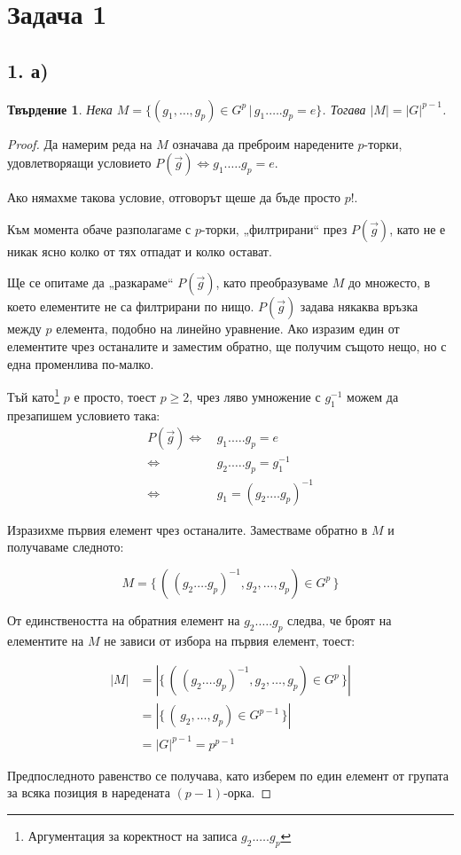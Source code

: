 \documentclass{article}
\newtheorem*{prop}{Твърдение}
\begin{document}
\section*{Задача 1}

\subsection*{1. а)}
\begin{prop}
    Нека $M = \{(g_1, \dots, g_p) \in G^p \, | \, g_1.\dots.g_p = e\}$.
    Тогава $|M| = |G|^{p-1}$.
\end{prop}
\begin{proof}
    Да намерим реда на $M$ означава да преброим наредените $p$-торки, удовлетворяащи условието
    $P(\vec g) \Leftrightarrow {g_1.\dots. g_p = e}$.

    Ако нямахме такова условие, отговорът щеше да бъде просто $p!$.

    Към момента обаче разполагаме с $p$-торки, „филтрирани“ през $P(\vec g)$, като не е никак ясно колко от тях отпадат и колко остават.

    Ще се опитаме да „разкараме“ $P(\vec g)$, като преобразуваме $M$ до множесто, в което елементите не са филтрирани по нищо.
    $P(\vec g)$ задава някаква връзка между $p$ елемента, подобно на линейно уравнение. Ако изразим един от елементите чрез останалите и заместим обратно, ще получим същото нещо, но с една променлива по-малко.

    Тъй като\footnote{Аргументация за коректност на записа $g_2 . \dots . g_p$} $p$ е просто, тоест $p \ge 2$, чрез ляво умножение с $g_1^{-1}$ можем да презапишем условието така:
    \begin{align*}
        P(\vec g) \Leftrightarrow \, &g_1.\dots.g_p = e \\
        \Leftrightarrow \, &g_2. \dots . g_p = g_1^{-1} \\
        \Leftrightarrow \, &g_1 = (g_2 . \dots g_p)^{-1}
    \end{align*}

    Изразихме първия елемент чрез останалите. Заместваме обратно в $M$ и получаваме следното:

    $$M = \{ \, (\,(g_2 . \dots g_p)^{-1}, g_2, \dots, g_p) \in G^p \,\}$$

    От единствеността на обратния елемент на $g_2.\dots.g_p$ следва, че броят на елементите на $M$ не зависи от избора на първия елемент, тоест:

    \begin{align*}
        |M| &= |\{ \, (\,(g_2 . \dots g_p)^{-1}, g_2, \dots, g_p) \in G^p \,\}|\\
        &= |\{ \, (\, g_2, \dots, g_p) \in G^{p-1} \,\}|\\
        &= {|G|}^{p-1} = p^{p-1}
    \end{align*}

    Предпоследното равенство се получава, като изберем по един елемент от групата за всяка позиция в наредената ${(p-1)}$-орка.
\end{proof}
\end{document}
